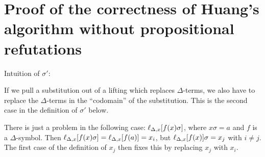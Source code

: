 \documentclass[,%
	paper=a4,%
	DIV14, 
	liststotoc,
	bibtotoc,
	draft=false,%
	numbers=noendperiod
]{scrartcl}
\newcommand{\lif}[1]{\lift{\Delta}{#1}{x}}
\begin{document}
\section{Proof of the correctness of Huang's algorithm without propositional refutations}


Intuition of $\sigma'$:

If we pull a substitution out of a lifting which replaces $\Delta$-terms, we also have to replace the $\Delta$-terms 
in the ``codomain'' of the substitution. This is the second case in the definition of $\sigma'$ below.

There is just a problem in the following case: $\lif{ f(x)\sigma }$, where $x\sigma = a$ and $f$ is a $\Delta$-symbol.
Then $\lif{ f(x)\sigma } = \lif{ f(a) } = x_i$, but $\lif{f(x)}\sigma = x_j$ with $i\neq j$.
The first case of the definition of $x_j$ then fixes this by replacing $x_j$ with $x_i$. 
\end{document}
